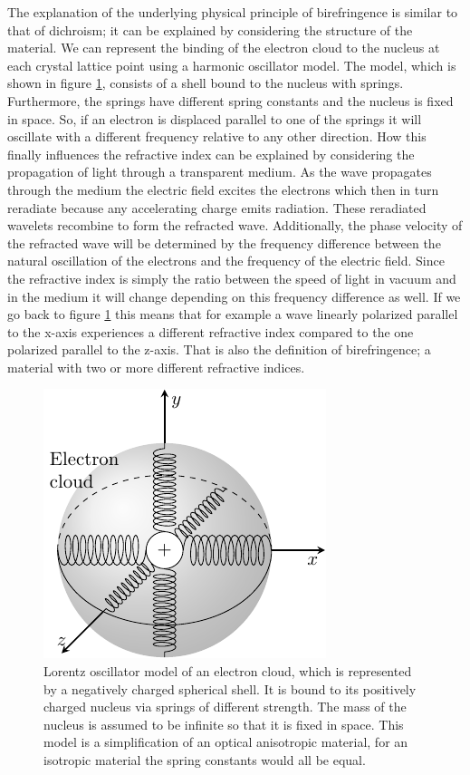 The explanation of the underlying physical principle of birefringence is similar to that of dichroism; it can be explained by considering the structure of the material. We can represent the binding of the electron cloud to the nucleus at each crystal lattice point using a harmonic oscillator model. The model, which is shown in figure \ref{fig:electron_shell}, consists of a shell bound to the nucleus with springs. Furthermore, the springs have different spring constants and the nucleus is fixed in space. So, if an electron is displaced parallel to one of the springs it will oscillate with a different frequency relative to any other direction. How this finally influences the refractive index can be explained by considering the propagation of light through a transparent medium. As the wave propagates through the medium the electric field excites the electrons which then in turn reradiate because any accelerating charge emits radiation. These reradiated wavelets recombine to form the refracted wave. Additionally, the phase velocity of the refracted wave will be determined by the frequency difference between the natural oscillation of the electrons and the frequency of the electric field. Since the refractive index is simply the ratio between the speed of light in vacuum and in the medium it will change depending on this frequency difference as well. If we go back to figure \ref{fig:electron_shell} this means that for example a wave linearly polarized parallel to the x-axis experiences a different refractive index compared to the one polarized parallel to the z-axis. That is also the definition of birefringence; a material with two or more different refractive indices. 

\begin{figure}[h]
    \centering
    \includegraphics[scale=0.9]{images/theory/tikz_electron_shell.pdf}
    \caption{Lorentz oscillator model of an electron cloud, which is represented by a negatively charged spherical shell. It is bound to its positively charged nucleus via springs of different strength. The mass of the nucleus is assumed to be infinite so that it is fixed in space. This model is a simplification of an optical anisotropic material, for an isotropic material the spring constants would all be equal.}
    \label{fig:electron_shell}
\end{figure}

